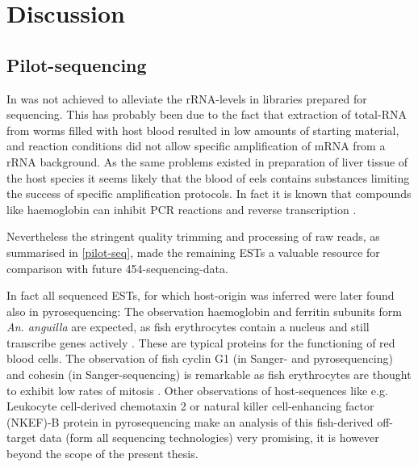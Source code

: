 
\chapter{Discussion} %



\ifpdf
    \graphicspath{{7_discussion/figures/PNG/}{7_discussion/figures/PDF/}{7_discussion/figures/}}
\else
    \graphicspath{{7_discussion/figures/EPS/}{7_discussion/figures/}}
\fi



\section{Pilot-sequencing}
\label{sec:sanger-pil}

In was not achieved to alleviate the rRNA-levels in libraries prepared
for sequencing. This has probably been due to the fact that extraction
of total-RNA from worms filled with host blood resulted in low amounts
of starting material, and reaction conditions did not allow specific
amplification of mRNA from a rRNA background. As the same problems
existed in preparation of liver tissue of the host species it seems
likely that the blood of eels contains substances limiting the success
of specific amplification protocols. In fact it is known that
compounds like haemoglobin can inhibit PCR reactions \cite{pmid9327537}
and reverse transcription \cite{pmid16109794}.

Nevertheless the stringent quality trimming and processing of raw
reads, as summarised in \ref{pilot-seq}, made the remaining ESTs a
valuable resource for comparison with future 454-sequencing-data.

In fact all sequenced ESTs, for which host-origin was inferred were
later found also in pyrosequencing: The observation haemoglobin and
ferritin subunits form \textit{An. anguilla} are expected, as fish
erythrocytes contain a nucleus and still transcribe genes actively
\cite{pmid20614118}. These are typical proteins for the functioning of
red blood cells. The observation of fish cyclin G1 (in Sanger- and
pyrosequencing) and cohesin (in Sanger-sequencing) is remarkable as
fish erythrocytes are thought to exhibit low rates of mitosis
\cite{pmid7506383}. Other observations of host-sequences like
e.g. Leukocyte cell-derived chemotaxin 2 or natural killer
cell-enhancing factor (NKEF)-B protein in pyrosequencing make an
analysis of this fish-derived off-target data (form all sequencing
technologies) very promising, it is however beyond the scope of the
present thesis.

